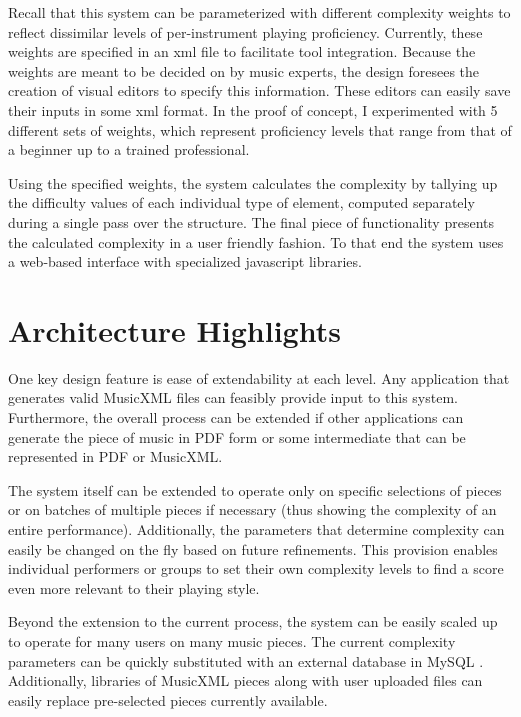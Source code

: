 \documentclass[12pt]{report}
\begin{document}
Recall that this system can be parameterized with different complexity weights to reflect dissimilar levels of per-instrument playing proficiency. Currently, these weights are specified in an xml file to facilitate tool integration. Because the weights are meant to be decided on by music experts, the design foresees the creation of visual editors to specify this information. These editors can easily save their inputs in some xml format. In the proof of concept, I experimented with 5 different sets of weights, which represent proficiency levels that range from that of a beginner up to a trained professional.

Using the specified weights, the system calculates the complexity by tallying up the difficulty values of each individual type of element, computed separately during a single pass over the structure. The final piece of functionality presents the calculated complexity in a user friendly fashion. To that end the system uses a web-based interface with specialized javascript libraries.

\section{Architecture Highlights} 
\label{sec:highlights}

One key design feature is ease of extendability at each level. Any application that generates valid MusicXML files can feasibly provide input to this system. Furthermore, the overall process can be extended if other applications can generate the piece of music in PDF form or some intermediate that can be represented in PDF or MusicXML.

The system itself can be extended to operate only on specific selections of pieces or on batches of multiple pieces if necessary (thus showing the complexity of an entire performance). Additionally, the parameters that determine complexity can easily be changed on the fly based on future refinements. This provision enables individual performers or groups to set their own complexity levels to find a score even more relevant to their playing style.

Beyond the extension to the current process, the system can be easily scaled up to operate for many users on many music pieces. The current complexity parameters can be quickly substituted with an external database in MySQL \cite{mysql}. Additionally, libraries of MusicXML pieces along with user uploaded files can easily replace pre-selected pieces currently available.
\end{document}
